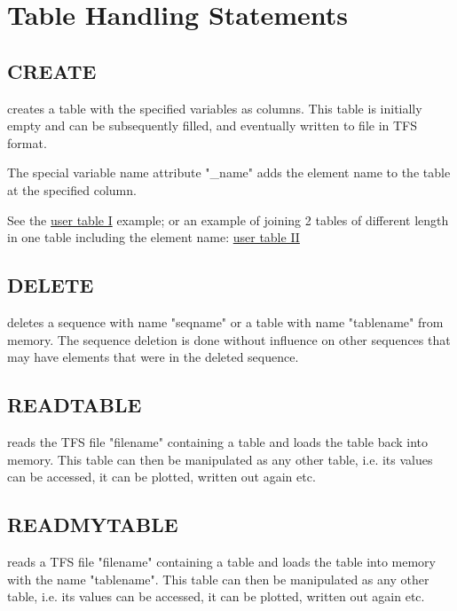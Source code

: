\chapter{Table Handling Statements} 
\label{chap:tables}

\section{CREATE}
\label{sec:create}
creates a table with the specified variables as columns. 
This table is initially empty and can be subsequently filled, and
eventually written to file in TFS format.  

The special variable name attribute "\_name" adds
the element name to the table at the specified column.


See the \href{../Introduction/select.html#ucreate}{user table I}
example; 
or an example of joining 2 tables of different length in one table
including the element name:
\href{../Introduction/select.html#screate}{user table II} 

\section{DELETE}
\label{sec:delete}
deletes a sequence with name "seqname" or a table with name "tablename"
from memory. The sequence deletion is done without influence on other
sequences that may have elements that were in the deleted sequence.   

\section{READTABLE}
\label{sec:readtable}
reads the TFS file "filename" containing a \mad table and loads the
table back into memory. This table can then be manipulated as any other
table, i.e. its values can be accessed, it can be plotted, written out
again etc.

\section{READMYTABLE}
\label{sec:readmytable}
reads a TFS file "filename" containing a \mad table and loads the table
into memory with the name "tablename". This table
can then be manipulated as any other table, i.e. its values can be
accessed, it can be plotted, written out again etc. 

